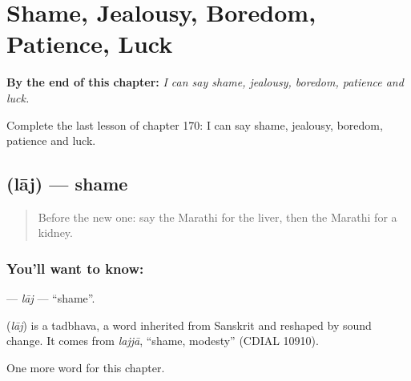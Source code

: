 
\chapter{Shame, Jealousy, Boredom, Patience, Luck}
\label{ch:mr-shame-jealousy-boredom-patience-luck}

\begin{chapteropening}
\textbf{By the end of this chapter:} \emph{I can say shame, jealousy, boredom, patience and luck.}

Complete the last lesson of chapter 170: I can say shame, jealousy, boredom, patience and luck.
\end{chapteropening}

\section[\texorpdfstring{\mr{लाज} (lāj)}{लाज (lāj)}]{ (lāj) — shame}

\label{lesson:MR-C170-laj}



\begin{quote}
Before the new one: say the Marathi for the liver, then the Marathi for a kidney.
\end{quote}

\subsection*{You'll want to know: }
\textbf{} — \emph{lāj} — \textquotedblleft{}shame\textquotedblright{}.

\begin{cousinweb}
\textbf{} (\emph{lāj}) is a tadbhava, a word inherited from Sanskrit and reshaped by sound change. It comes from \emph{lajjā}, \textquotedblleft{}shame, modesty\textquotedblright{} (CDIAL 10910).
\end{cousinweb}

\begin{grammarlens}[title={What you've built}]
One more word for this chapter.
\end{grammarlens}

